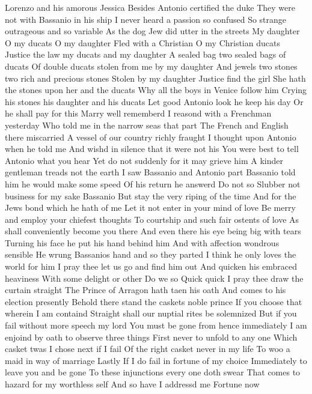 Lorenzo and his amorous Jessica 
Besides Antonio certified the duke 
They were not with Bassanio in his ship 
I never heard a passion so confused 
So strange outrageous and so variable 
As the dog Jew did utter in the streets 
My daughter O my ducats O my daughter 
Fled with a Christian O my Christian ducats 
Justice the law my ducats and my daughter 
A sealed bag two sealed bags of ducats 
Of double ducats stolen from me by my daughter 
And jewels two stones two rich and precious stones 
Stolen by my daughter Justice find the girl 
She hath the stones upon her and the ducats 
Why all the boys in Venice follow him 
Crying his stones his daughter and his ducats 
Let good Antonio look he keep his day 
Or he shall pay for this 
Marry well rememberd 
I reasond with a Frenchman yesterday 
Who told me in the narrow seas that part 
The French and English there miscarried 
A vessel of our country richly fraught 
I thought upon Antonio when he told me 
And wishd in silence that it were not his 
You were best to tell Antonio what you hear 
Yet do not suddenly for it may grieve him 
A kinder gentleman treads not the earth 
I saw Bassanio and Antonio part 
Bassanio told him he would make some speed 
Of his return he answerd Do not so 
Slubber not business for my sake Bassanio 
But stay the very riping of the time 
And for the Jews bond which he hath of me 
Let it not enter in your mind of love 
Be merry and employ your chiefest thoughts 
To courtship and such fair ostents of love 
As shall conveniently become you there 
And even there his eye being big with tears 
Turning his face he put his hand behind him 
And with affection wondrous sensible 
He wrung Bassanios hand and so they parted 
I think he only loves the world for him 
I pray thee let us go and find him out 
And quicken his embraced heaviness 
With some delight or other 
Do we so 
Quick quick I pray thee draw the curtain straight 
The Prince of Arragon hath taen his oath 
And comes to his election presently 
Behold there stand the caskets noble prince 
If you choose that wherein I am containd 
Straight shall our nuptial rites be solemnized 
But if you fail without more speech my lord 
You must be gone from hence immediately 
I am enjoind by oath to observe three things 
First never to unfold to any one 
Which casket twas I chose next if I fail 
Of the right casket never in my life 
To woo a maid in way of marriage Lastly 
If I do fail in fortune of my choice 
Immediately to leave you and be gone 
To these injunctions every one doth swear 
That comes to hazard for my worthless self 
And so have I addressd me Fortune now 
